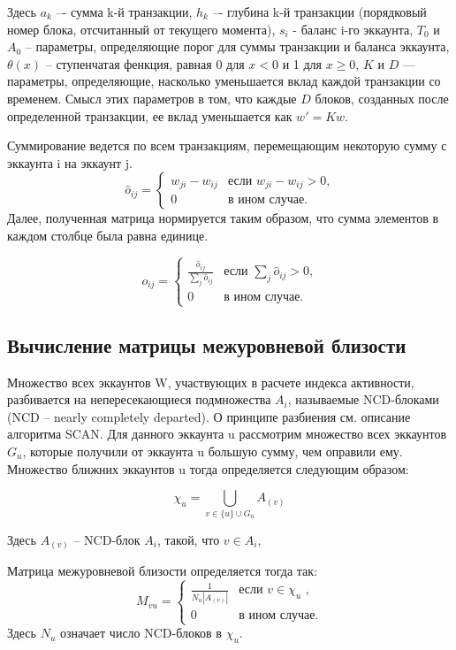 \documentclass[a4paper,12pt]{article}
\begin{document}
Здесь $a_k$ –- сумма k-й транзакции, $h_k$ –- глубина  k-й транзакции (порядковый номер блока, отсчитанный от текущего момента), $s_i$ - баланс i-го эккаунта, $T_0$ и $A_0$ -- параметры, определяющие порог для суммы транзакции и баланса эккаунта, $\theta(x)$ -- ступенчатая фенкция, равная 0 для $x<0$ и 1 для $x \ge 0$, $K$ и  $D$ — параметры, определяющие, насколько уменьшается вклад каждой транзакции со временем. Смысл этих параметров в том, что каждые $D$ блоков, созданных после определенной транзакции, ее вклад уменьшается как $w'=Kw$.

Суммирование ведется по всем транзакциям, перемещающим некоторую сумму с эккаунта i на эккаунт j.
$$
\hat{o}_{ij} = \begin{cases}
 w_{ji}-w_{ij}
 & \text{если $w_{ji}-w_{ij} > 0$,}\\
 0 & \text{в ином случае.}
\end{cases}
$$
Далее, полученная матрица нормируется таким образом, что сумма элементов в каждом столбце была равна единице. 

$$
o_{ij} = \begin{cases}
 \frac{\hat{o}_{ij}} {\sum\limits_{j} \hat{o}_{ij}}
 & \text{если $\sum\limits_{j} \hat{o}_{ij}> 0$,}\\
 0 & \text{в ином случае.}
\end{cases} 
$$

\subsection{Вычисление матрицы межуровневой близости}

Множество всех эккаунтов W, участвующих в расчете индекса активности, разбивается на непересекающиеся подмножества $A_i$, называемые NCD-блоками (NCD – nearly completely departed). О принципе разбиения см. описание алгоритма SCAN. 
Для данного эккаунта u рассмотрим множество всех эккаунтов $G_u$, которые получили от эккаунта u большую сумму, чем оправили ему. Множество ближних эккаунтов u тогда определяется следующим образом:

$$
\chi_u = \bigcup_{v \in \{u\} \cup G_u} A_{(v)}
$$

Здесь $A_{(v)}$ -- NCD-блок $A_i$, такой, что $v \in A_i$, 

Матрица межуровневой близости определяется тогда так:
$$
M_{vu}=\begin{cases}
 \frac{1}{N_u |A_{(v)}|}
 & \text{если $v \in \chi_u$ ,}\\
 0 & \text{в ином случае.}
\end{cases}
$$
Здесь $N_u$ означает число NCD-блоков в $\chi_u$.
\end{document}

